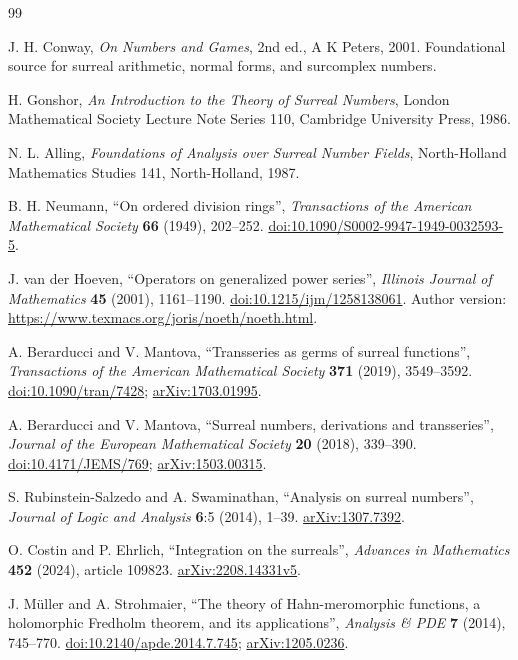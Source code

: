 \documentclass[11pt,letterpaper]{article}
\numberwithin{equation}{section}
\theoremstyle{definition}
\theoremstyle{remark}
\begin{document}
\begin{thebibliography}{99}
J. H. Conway, \emph{On Numbers and Games}, 2nd ed., A K Peters, 2001.
Foundational source for surreal arithmetic, normal forms, and surcomplex
numbers.

H. Gonshor, \emph{An Introduction to the Theory of Surreal Numbers},
London Mathematical Society Lecture Note Series 110, Cambridge University
Press, 1986.

N. L. Alling, \emph{Foundations of Analysis over Surreal Number Fields},
North-Holland Mathematics Studies 141, North-Holland, 1987.

B. H. Neumann, ``On ordered division rings'',
\emph{Transactions of the American Mathematical Society} \textbf{66}
(1949), 202--252.
\href{https://doi.org/10.1090/S0002-9947-1949-0032593-5}{doi:10.1090/S0002-9947-1949-0032593-5}.

J. van der Hoeven, ``Operators on generalized power series'',
\emph{Illinois Journal of Mathematics} \textbf{45} (2001), 1161--1190.
\href{https://doi.org/10.1215/ijm/1258138061}{doi:10.1215/ijm/1258138061}.
Author version: \url{https://www.texmacs.org/joris/noeth/noeth.html}.

A. Berarducci and V. Mantova, ``Transseries as germs of surreal functions'',
\emph{Transactions of the American Mathematical Society} \textbf{371}
(2019), 3549--3592.
\href{https://doi.org/10.1090/tran/7428}{doi:10.1090/tran/7428};
\href{https://arxiv.org/abs/1703.01995}{arXiv:1703.01995}.

A. Berarducci and V. Mantova, ``Surreal numbers, derivations and transseries'',
\emph{Journal of the European Mathematical Society} \textbf{20} (2018),
339--390.
\href{https://doi.org/10.4171/JEMS/769}{doi:10.4171/JEMS/769};
\href{https://arxiv.org/abs/1503.00315}{arXiv:1503.00315}.

S. Rubinstein-Salzedo and A. Swaminathan, ``Analysis on surreal numbers'',
\emph{Journal of Logic and Analysis} \textbf{6}:5 (2014), 1--39.
\href{https://arxiv.org/abs/1307.7392}{arXiv:1307.7392}.

O. Costin and P. Ehrlich, ``Integration on the surreals'',
\emph{Advances in Mathematics} \textbf{452} (2024), article 109823.
\href{https://arxiv.org/abs/2208.14331}{arXiv:2208.14331v5}.

J. M\"uller and A. Strohmaier, ``The theory of Hahn-meromorphic functions,
a holomorphic Fredholm theorem, and its applications'',
\emph{Analysis \& PDE} \textbf{7} (2014), 745--770.
\href{https://doi.org/10.2140/apde.2014.7.745}{doi:10.2140/apde.2014.7.745};
\href{https://arxiv.org/abs/1205.0236}{arXiv:1205.0236}.


\end{thebibliography}
\end{document}
